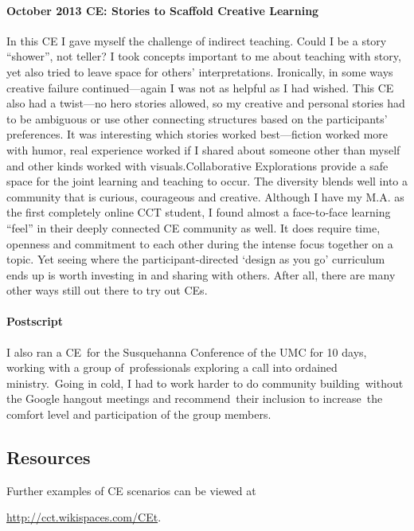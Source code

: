 \paragraph{October 2013 CE: Stories to Scaffold Creative Learning}

In this CE I gave myself the challenge of indirect teaching. Could I be
a story ``shower'', not teller? I took concepts important to me about
teaching with story, yet also tried to leave space for others'
interpretations. Ironically, in some ways creative failure
continued---again I was not as helpful as I had wished. This CE also had
a twist---no hero stories allowed, so my creative and personal stories
had to be ambiguous or use other connecting structures based on the
participants' preferences. It was interesting which stories worked
best---fiction worked more with humor, real experience worked if I
shared about someone other than myself and other kinds worked with
visuals.Collaborative Explorations provide a safe space for the joint
learning and teaching to occur. The diversity blends well into a
community that is curious, courageous and creative. Although I have my
M.A. as the first completely online CCT student, I found almost a
face-to-face learning ``feel'' in their deeply connected CE community as
well. It does require time, openness and commitment to each other during
the intense focus together on a topic. Yet seeing where the
participant-directed `design as you go' curriculum ends up is worth
investing in and sharing with others. After all, there are many other
ways still out there to try out CEs.

\paragraph{Postscript}

I also ran a CE~for the Susquehanna Conference of the UMC for 10 days,
working with a group of~professionals exploring a call into ordained
ministry.~Going in cold, I had to work harder to do community
building~without the Google hangout meetings and recommend~their
inclusion to increase~the comfort level and participation of the group
members.

\subsection{Resources}

\noindent Further examples of CE scenarios can be viewed at
{\center
\url{http://cct.wikispaces.com/CEt}.\par}

